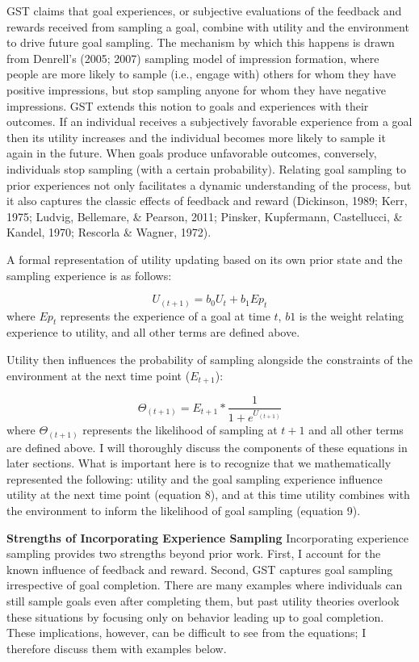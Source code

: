 \documentclass[english,,man]{apa6}
\theoremstyle{definition}
\theoremstyle{definition}
\theoremstyle{definition}
\theoremstyle{remark}
\begin{document}
GST claims that goal experiences, or subjective evaluations of the
feedback and rewards received from sampling a goal, combine with utility
and the environment to drive future goal sampling. The mechanism by
which this happens is drawn from Denrell's (2005; 2007) sampling model
of impression formation, where people are more likely to sample (i.e.,
engage with) others for whom they have positive impressions, but stop
sampling anyone for whom they have negative impressions. GST extends
this notion to goals and experiences with their outcomes. If an
individual receives a subjectively favorable experience from a goal then
its utility increases and the individual becomes more likely to sample
it again in the future. When goals produce unfavorable outcomes,
conversely, individuals stop sampling (with a certain probability).
Relating goal sampling to prior experiences not only facilitates a
dynamic understanding of the process, but it also captures the classic
effects of feedback and reward (Dickinson, 1989; Kerr, 1975; Ludvig,
Bellemare, \& Pearson, 2011; Pinsker, Kupfermann, Castellucci, \&
Kandel, 1970; Rescorla \& Wagner, 1972).

A formal representation of utility updating based on its own prior state
and the sampling experience is as follows:

\begin{equation}
U_{(t+1)} = b_0 U_{t} + b_1 Ep_t
\end{equation} \noindent where \(Ep_t\) represents the experience of a
goal at time \(t\), \(b1\) is the weight relating experience to utility,
and all other terms are defined above.

Utility then influences the probability of sampling alongside the
constraints of the environment at the next time point (\(E_{t+1}\)):

\begin{equation}
\Theta_{(t+1)} = E_{t+1} * {\frac {1}{1 + e^{U_{(t+1)}}}}
\end{equation} \noindent where \(\Theta_{(t+1)}\) represents the
likelihood of sampling at \(t+1\) and all other terms are defined above.
I will thoroughly discuss the components of these equations in later
sections. What is important here is to recognize that we mathematically
represented the following: utility and the goal sampling experience
influence utility at the next time point (equation 8), and at this time
utility combines with the environment to inform the likelihood of goal
sampling (equation 9).

\textbf{Strengths of Incorporating Experience Sampling} Incorporating
experience sampling provides two strengths beyond prior work. First, I
account for the known influence of feedback and reward. Second, GST
captures goal sampling irrespective of goal completion. There are many
examples where individuals can still sample goals even after completing
them, but past utility theories overlook these situations by focusing
only on behavior leading up to goal completion. These implications,
however, can be difficult to see from the equations; I therefore discuss
them with examples below.
\end{document}
